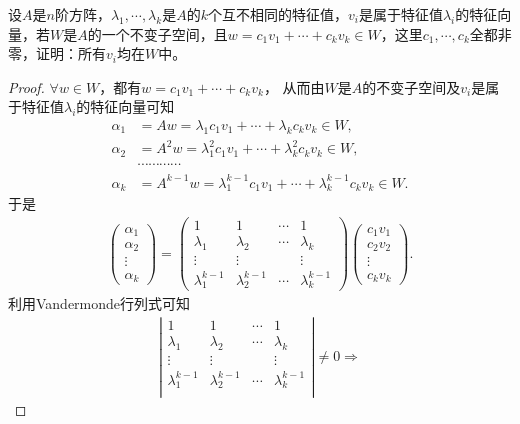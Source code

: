 \documentclass[../../main.tex]{subfiles}%
\begin{document}
\begin{example}
设$A$是$n$阶方阵，$\lambda_1,\cdots,\lambda_k$是$A$的$k$个互不相同的特征值，$v_i$是属于特征值$\lambda_i$的特征向量，若$W$是$A$的一个不变子空间，且$w = c_1v_1 + \cdots + c_kv_k\in W$，这里$c_1,\cdots,c_k$全都非零，证明：所有$v_i$均在$W$中。 
\end{example}
\begin{proof}
$\forall w\in W$，都有$w = c_1v_1 + \cdots + c_kv_k$，
从而由$W$是$A$的不变子空间及$v_i$是属于特征值$\lambda_i$的特征向量可知
\begin{align*}
\alpha_1 &= Aw = \lambda_1c_1v_1 + \cdots + \lambda_kc_kv_k\in W, \\
\alpha_2 &= A^2w = \lambda_1^2c_1v_1 + \cdots + \lambda_k^2c_kv_k\in W, \\
&\cdots \cdots \cdots \cdots \\
\alpha_k &= A^{k - 1}w = \lambda_1^{k - 1}c_1v_1 + \cdots + \lambda_k^{k - 1}c_kv_k\in W.
\end{align*}
于是
\begin{align*}
\begin{pmatrix}
\alpha_1 \\
\alpha_2 \\
\vdots \\
\alpha_k
\end{pmatrix} = 
\begin{pmatrix}
1 & 1 & \cdots & 1 \\
\lambda_1 & \lambda_2 & \cdots & \lambda_k \\
\vdots & \vdots & & \vdots \\
\lambda_1^{k - 1} & \lambda_2^{k - 1} & \cdots & \lambda_k^{k - 1}
\end{pmatrix}
\begin{pmatrix}
c_1v_1 \\
c_2v_2 \\
\vdots \\
c_kv_k
\end{pmatrix}.
\end{align*}
利用Vandermonde行列式可知
\begin{align*}
\left| \begin{matrix}
1&		1&		\cdots&		1\\
\lambda _1&		\lambda _2&		\cdots&		\lambda _k\\
\vdots&		\vdots&		&		\vdots\\
\lambda _{1}^{k-1}&		\lambda _{2}^{k-1}&		\cdots&		\lambda _{k}^{k-1}\\
\end{matrix} \right|\ne 0\Rightarrow 

\end{align*}
\end{proof}
\end{document}
